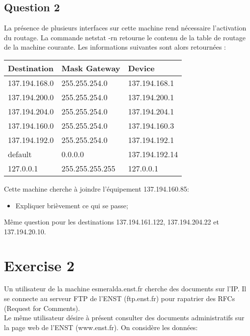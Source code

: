 \documentclass{article}
\begin{document}
\subsection*{Question 2}
La présence de plusieurs interfaces sur cette machine rend nécessaire l'activation du routage. La commande netstat -rn retourne le contenu de la table de routage de la machine courante. Les informations suivantes sont alors retournées :
\begin{table}[H]
    \centering\begin{tabular}{lll}
        Destination & Mask Gateway & Device\\
        \hline
        137.194.168.0 & 255.255.254.0   & 137.194.168.1\\
        137.194.200.0 & 255.255.254.0   & 137.194.200.1\\
        137.194.204.0 & 255.255.254.0   & 137.194.204.1\\
        137.194.160.0 & 255.255.254.0   & 137.194.160.3\\
        137.194.192.0 & 255.255.254.0   & 137.194.192.1\\
        default       & 0.0.0.0         & 137.194.192.14\\
        127.0.0.1     & 255.255.255.255 & 127.0.0.1\\
        \hline
    \end{tabular}
\end{table}
\begin{exercise}
    Cette machine cherche à joindre l'équipement 137.194.160.85:
    \begin{itemize}
        \item Expliquer brièvement ce qui se passe;
    \end{itemize}
    Même question pour les destinations 137.194.161.122, 137.194.204.22 et 137.194.20.10.
\end{exercise}


\section*{Exercise 2}
Un utilisateur de la machine esmeralda.enst.fr cherche des documents sur l'IP. Il se connecte au serveur FTP de l'ENST (ftp.enst.fr) pour rapatrier des RFCs (Request for Comments).\\

Le même utilisateur désire à présent consulter des documents administratifs sur la page web de l'ENST (www.enst.fr). On considère les données:
\end{document}
